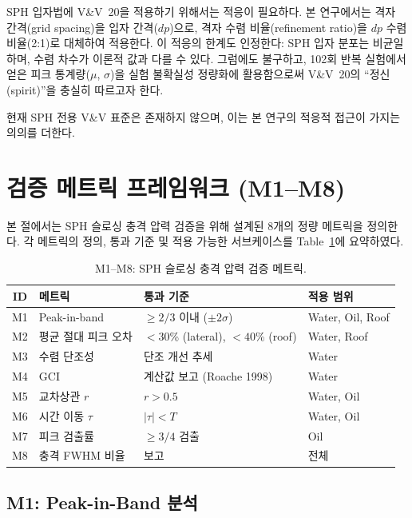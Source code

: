 \documentclass[11pt]{article}
\begin{document}
SPH 입자법에 V\&V~20을 적용하기 위해서는 적응이 필요하다.
본 연구에서는 격자 간격(grid spacing)을 입자 간격($dp$)으로, 격자 수렴 비율(refinement ratio)을
$dp$ 수렴 비율(2:1)로 대체하여 적용한다.
이 적응의 한계도 인정한다: SPH 입자 분포는 비균일하며, 수렴 차수가 이론적 값과
다를 수 있다. 그럼에도 불구하고, 102회 반복 실험에서 얻은 피크 통계량($\mu$, $\sigma$)을
실험 불확실성 정량화에 활용함으로써 V\&V~20의 ``정신(spirit)''을 충실히 따르고자 한다.

현재 SPH 전용 V\&V 표준은 존재하지 않으며, 이는 본 연구의 적응적 접근이 가지는
의의를 더한다.


\section{검증 메트릭 프레임워크 (M1--M8)} \label{sec:metrics}
\setcounter{equation}{0}

본 절에서는 SPH 슬로싱 충격 압력 검증을 위해 설계된 8개의 정량 메트릭을 정의한다.
각 메트릭의 정의, 통과 기준 및 적용 가능한 서브케이스를 Table~\ref{tab:metrics}에
요약하였다.

\begin{table}[H]
\caption{M1--M8: SPH 슬로싱 충격 압력 검증 메트릭.}
\label{tab:metrics}
\centering
\small
\begin{tabular}{@{}clll@{}}
\toprule
ID & 메트릭 & 통과 기준 & 적용 범위 \\
\midrule
M1 & Peak-in-band & $\geq 2/3$ 이내 ($\pm 2\sigma$) & Water, Oil, Roof \\
M2 & 평균 절대 피크 오차 & $<30$\% (lateral), $<40$\% (roof) & Water, Roof \\
M3 & 수렴 단조성 & 단조 개선 추세 & Water \\
M4 & GCI & 계산값 보고 (Roache 1998) & Water \\
M5 & 교차상관 $r$ & $r > 0.5$ & Water, Oil \\
M6 & 시간 이동 $\tau$ & $|\tau| < T$ & Water, Oil \\
M7 & 피크 검출률 & $\geq 3/4$ 검출 & Oil \\
M8 & 충격 FWHM 비율 & 보고 & 전체 \\
\bottomrule
\end{tabular}
\end{table}


\subsection{M1: Peak-in-Band 분석} \label{sec:m1}
\end{document}
